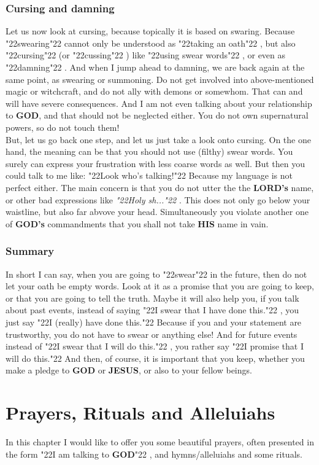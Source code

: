 \documentclass[12pt,a5paper]{article}
\newcommand{\God}[0]{\textbf{GOD}}
\newcommand{\Gods}[0]{\textbf{GOD's}}
\newcommand{\His}[0]{\textbf{HIS}}
\newcommand{\Jesus}[0]{\textbf{JESUS}}
\newcommand{\Lords}[0]{\textbf{LORD's}}
\newcommand{\q}[1]{\char"22{#1}\char"22 }
\begin{document}
	\subsubsection{Cursing and damning}
		Let us now look at cursing,
		because topically it is based on swaring.
		Because \q{swearing} cannot only be understood as \q{taking an oath},
		but also \q{cursing} (or \q{cussing})
		like \q{using swear words},
		or even as \q{damning}.
		And when I jump ahead to damning,
		we are back again at the same point,
		as swearing or summoning.
		Do not get involved into above-mentioned magic or witchcraft,
		and do not ally with demons or somewhom.
		That can and will have severe consequences.
		And I am not even talking about your relationship to {\God},
		and that should not be neglected either.
		You do not own supernatural powers,
		so do not touch them!
		\\
		But,
		let us go back one step,
		and let us just take a look onto cursing.
		On the one hand,
		the meaning can be that you should not use (filthy) swear words.
		You surely can express your frustration with less coarse words as well.
		But then you could talk to me like:
		\q{Look who's talking!}
		Because my language is not perfect either.
		The main concern is that you do not utter the the {\Lords} name,
		or other bad expressions like \textit{\q{Holy sh...}}.
		This does not only go below your waistline,
		but also far abvove your head.
		Simultaneously you violate another one of {\Gods} commandments that you shall not take {\His} name in vain.

	\subsubsection{Summary}
		In short I can say,
		when you are going to \q{swear} in the future,
		then do not let your oath be empty words.
		Look at it as a promise that you are going to keep,
		or that you are going to tell the truth.
		Maybe it will also help you,
		if you talk about past events,
		instead of saying \q{I swear that I have done this.},
		you just say \q{I (really) have done this.}
		Because if you and your statement are trustworthy,
		you do not have to swear or anything else!
		And for future events instead of \q{I swear that I will do this.},
		you rather say \q{I promise that I will do this.}
		And then,
		of course,
		it is important that you keep,
		whether you make a pledge to {\God} or {\Jesus},
		or also to your fellow beings.

	\newpage
	\section{Prayers, Rituals and Alleluiahs}
		In this chapter I would like to offer you some beautiful prayers,
		often presented in the form \q{I am talking to {\God}},
		and hymns/alleluiahs and some rituals.
\end{document}
